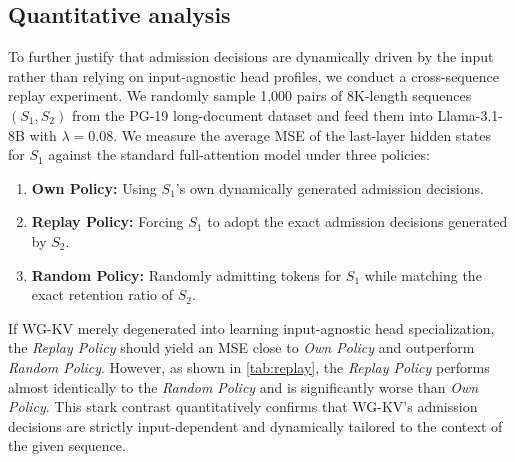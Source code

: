 \subsection{Quantitative analysis}

To further justify that admission decisions are dynamically driven by the input rather than relying on input-agnostic head profiles, we conduct a cross-sequence replay experiment. We randomly sample 1,000 pairs of 8K-length sequences $(S_1,S_2)$ from the PG-19 \cite{pg19} long-document dataset and feed them into Llama-3.1-8B with $\lambda=0.08$. We measure the average MSE of the last-layer hidden states for $S_1$ against the standard full-attention model under three policies:

\begin{enumerate}
    \item \textbf{Own Policy:} Using $S_1$'s own dynamically generated admission decisions.
    \item \textbf{Replay Policy:} Forcing $S_1$ to adopt the exact admission decisions generated by $S_2$.
    \item \textbf{Random Policy:} Randomly admitting tokens for $S_1$ while matching the exact retention ratio of $S_2$.
\end{enumerate}


If WG-KV merely degenerated into learning input-agnostic head specialization, the \textit{Replay Policy} should yield an MSE close to \textit{Own Policy} and outperform \textit{Random Policy}. However, as shown in \cref{tab:replay}, the \textit{Replay Policy} performs almost identically to the \textit{Random Policy} and is significantly worse than \textit{Own Policy}. This stark contrast quantitatively confirms that WG-KV's admission decisions are strictly input-dependent and dynamically tailored to the context of the given sequence.